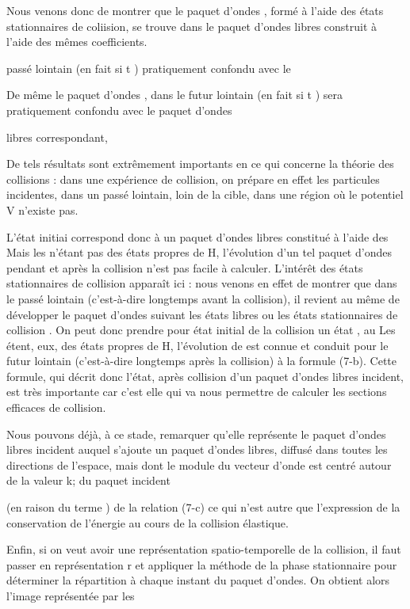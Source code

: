 Nous venons donc de montrer que le paquet d'ondes  ,
formé à l'aide des états stationnaires de coliision, se trouve dans le
paquet d'ondes libres  construit à l'aide des mêmes coefficients.

passé lointain (en fait si t ) pratiquement confondu avec le

De même le paquet d'ondes  , dans le futur lointain
(en fait si t  ) sera pratiquement confondu avec le paquet d'ondes

libres  correspondant,

De tels résultats sont extrêmement importants en ce qui concerne
la théorie des collisions : dans une expérience de collision, on prépare
en effet les particules incidentes, dans un passé lointain, loin de la
cible, dans une région où le potentiel V n'existe pas.

L'état initiai correspond donc à un paquet d'ondes libres
 constitué à l'aide des  Mais les  n'étant pas des
états propres de H, l'évolution d'un tel paquet d'ondes pendant et après
la collision n'est pas facile à calculer. L'intérêt des états stationnaires de
collision apparaît ici : nous venons en effet de montrer que dans
le passé lointain (c'est-à-dire longtemps avant la collision), il revient
au même de développer le paquet d'ondes suivant les états libres  ou
les états stationnaires de collision  . On peut donc prendre pour
état initial de la collision un état  , au  Les
 étent, eux, des états propres de H, l'évolution de  est
connue et conduit pour le futur lointain (c'est-à-dire longtemps après la
collision) à la formule (7-b). Cette formule, qui décrit donc l'état,
après collision d'un paquet d'ondes libres incident, est très importante
car c'est elle qui va nous permettre de calculer les sections efficaces
de collision.

Nous pouvons déjà, à ce stade, remarquer qu'elle représente le
paquet d'ondes libres incident auquel s'ajoute un paquet d'ondes libres,
diffusé dans toutes les directions de l'espace, mais dont le module du
vecteur d'onde est centré autour de la valeur k; du paquet incident


(en raison du terme ) de la relation (7-c) ce qui n'est autre
que l'expression de la conservation de l'énergie au cours de la collision élastique.

Enfin, si on veut avoir une représentation spatio-temporelle
de la collision, il faut passer en représentation r et appliquer la méthode de la
phase stationnaire pour déterminer la répartition à chaque
instant du paquet d'ondes. On obtient alors l'image représentée par les

